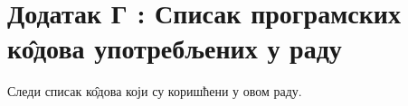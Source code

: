 \section{Додатак Г : Списак програмских к\^{о}дова употребљених у раду}

Следи списак к\^{о}дова који су коришћени у овом раду.

\lstlistoflistings
